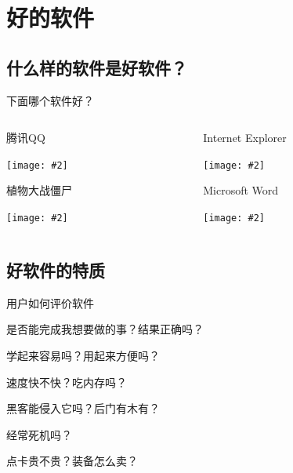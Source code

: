 
\section{好的软件}

\subsection[什么是好软件]{什么样的软件是好软件？}

\newenvironment{iconblock}[2]{
    \begin{block}{#1}
    \begin{center}
    \texttt{[image: \#2]}}
{\end{center}
    \end{block}
}

\begin{frame}{下面哪个软件好？}
  \begin{columns}[T]
    \begin{column}{4cm}
      \begin{iconblock}{腾讯QQ}{qq.jpg}\end{iconblock}
      \begin{iconblock}{植物大战僵尸}{pvz.jpg}\end{iconblock}
    \end{column}
    \begin{column}{4cm}
      \begin{iconblock}{Internet Explorer}{ie.png}\end{iconblock}
      \begin{iconblock}{Microsoft Word}{word.png}\end{iconblock}
    \end{column}
  \end{columns}

\end{frame}

\subsection{好软件的特质}

\begin{frame}{用户如何评价软件}
  \begin{description}[正确性]
    \item[正确性] 是否能完成我想要做的事？结果正确吗？
      \pause
    \item[易用性] 学起来容易吗？用起来方便吗？
      \pause
    \item[性能] 速度快不快？吃内存吗？
      \pause
    \item[安全性] 黑客能侵入它吗？后门有木有？
      \pause
    \item[稳定性] 经常死机吗？
      \pause
    \item[成本] 点卡贵不贵？装备怎么卖？
  \end{description}
\end{frame}

